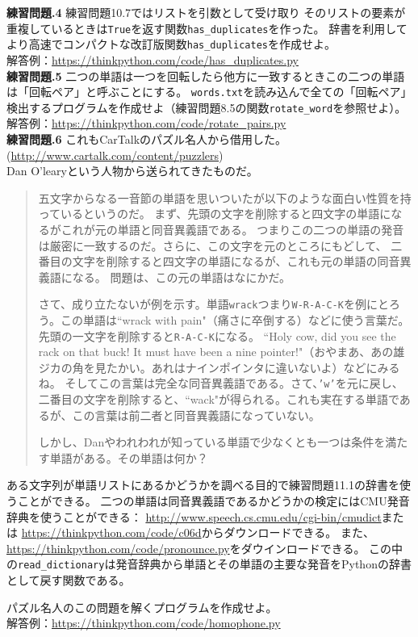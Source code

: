 \documentclass[a4j,12pt,makeidx]{jbook}
\newcommand{\tp}{\thechapter}
\begin{document}
\noindent
{\bf 練習問題\tp.4} 練習問題10.7ではリストを引数として受け取り
そのリストの要素が重複しているときは{\tt True}を返す関数{\tt has\_duplicates}を作った。
辞書を利用してより高速でコンパクトな改訂版関数{\tt has\_duplicates}を作成せよ。 \\
解答例：\url{https://thinkpython.com/code/has_duplicates.py}\\

\noindent
{\bf 練習問題\tp.5} 二つの単語は一つを回転したら他方に一致するときこの二つの単語は「回転ペア」と呼ぶことにする。
{\tt words.txt}を読み込んで全ての「回転ペア」検出するプログラムを作成せよ（練習問題8.5の関数{\tt rotate\_word}を参照せよ）。\\
解答例：\url{https://thinkpython.com/code/rotate_pairs.py} \\

\noindent
{\bf 練習問題\tp.6} これもCarTalkのパズル名人から借用した。　\\
(\url{http://www.cartalk.com/content/puzzlers}) \\
Dan O'learyという人物から送られてきたものだ。
\begin{quote}
五文字からなる一音節の単語を思いついたが以下のような面白い性質を持っているというのだ。
まず、先頭の文字を削除すると四文字の単語になるがこれが元の単語と同音異義語である。
つまりこの二つの単語の発音は厳密に一致するのだ。さらに、この文字を元のところにもどして、
二番目の文字を削除すると四文字の単語になるが、これも元の単語の同音異義語になる。
問題は、この元の単語はなにかだ。\par
さて、成り立たないが例を示す。単語{\tt wrack}つまり{\tt W-R-A-C-K}を例にとろう。この単語は``wrack with pain"（痛さに卒倒する）などに使う言葉だ。先頭の一文字を削除すると{\tt R-A-C-K}になる。
``Holy cow, did you see the rack on that buck! It must have been a nine pointer!"（おやまあ、あの雄ジカの角を見たかい。あれはナインポインタに違いないよ）などにみるね。
そしてこの言葉は完全な同音異義語である。さて、{\tt 'w'}を元に戻し、
二番目の文字を削除すると、``wack"が得られる。これも実在する単語であるが、この言葉は前二者と同音異義語になっていない。\par
しかし、Danやわれわれが知っている単語で少なくとも一つは条件を満たす単語がある。その単語は何か？
\end{quote}
ある文字列が単語リストにあるかどうかを調べる目的で練習問題11.1の辞書を使うことができる。
二つの単語は同音異義語であるかどうかの検定にはCMU発音辞典を使うことができる：
\url{http://www.speech.cs.cmu.edu/cgi-bin/cmudict}または 
\url{https://thinkpython.com/code/c06d}からダウンロードできる。
また、\url{https://thinkpython.com/code/pronounce.py}をダウインロードできる。
この中の{\tt read\_dictionary}は発音辞典から単語とその単語の主要な発音をPythonの辞書として戻す関数である。\par
パズル名人のこの問題を解くプログラムを作成せよ。\\
解答例：\url{https://thinkpython.com/code/homophone.py}
%
\end{document}
